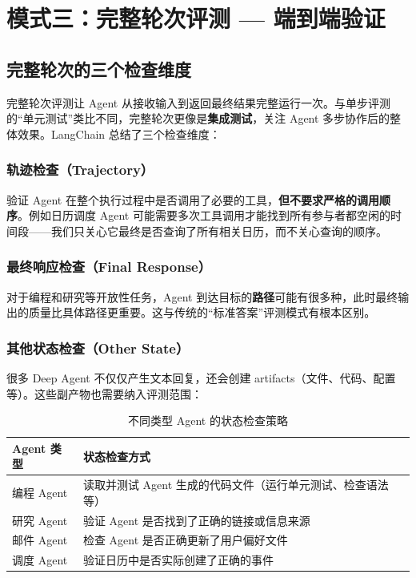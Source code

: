 \section{模式三：完整轮次评测 --- 端到端验证}

\subsection{完整轮次的三个检查维度}

完整轮次评测让 Agent 从接收输入到返回最终结果完整运行一次。与单步评测的``单元测试''类比不同，完整轮次更像是\textbf{集成测试}，关注 Agent 多步协作后的整体效果。LangChain 总结了三个检查维度：

\subsubsection{轨迹检查（Trajectory）}

验证 Agent 在整个执行过程中是否调用了必要的工具，\textbf{但不要求严格的调用顺序}。例如日历调度 Agent 可能需要多次工具调用才能找到所有参与者都空闲的时间段——我们只关心它最终是否查询了所有相关日历，而不关心查询的顺序。

\subsubsection{最终响应检查（Final Response）}

对于编程和研究等开放性任务，Agent 到达目标的\textbf{路径}可能有很多种，此时最终输出的质量比具体路径更重要。这与传统的``标准答案''评测模式有根本区别。

\subsubsection{其他状态检查（Other State）}

很多 Deep Agent 不仅仅产生文本回复，还会创建 artifacts（文件、代码、配置等）。这些副产物也需要纳入评测范围：

\begin{table}[H]
\centering
\caption{不同类型 Agent 的状态检查策略}
\begin{tabular}{lp{9cm}}
\toprule
\textbf{Agent 类型} & \textbf{状态检查方式} \\
\midrule
编程 Agent & 读取并测试 Agent 生成的代码文件（运行单元测试、检查语法等） \\
研究 Agent & 验证 Agent 是否找到了正确的链接或信息来源 \\
邮件 Agent & 检查 Agent 是否正确更新了用户偏好文件 \\
调度 Agent & 验证日历中是否实际创建了正确的事件 \\
\bottomrule
\end{tabular}
\end{table}

